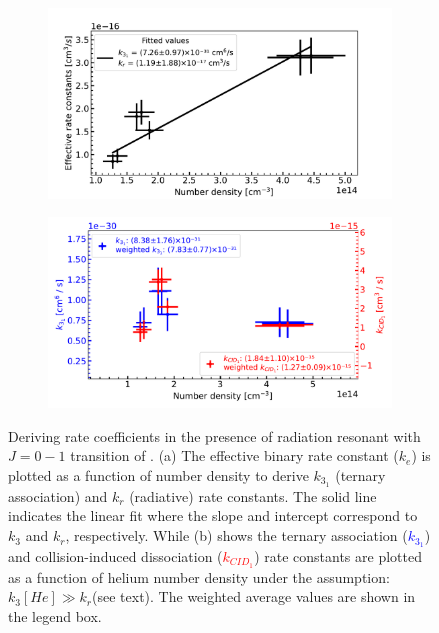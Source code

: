 \begin{figure}[!htb]
    \centering
    \begin{subfigure}[b]{0.49\textwidth}
        \centering
        \includegraphics[width=1\textwidth]{figures/measurements/kinetics/functionOf_nHe/on_4.8K_k31_effective_rate_constants.pdf}
        \caption{}
        \label{fig:on:effective-rate-constants}
    \end{subfigure}
    \hfill
    \begin{subfigure}[b]{0.49\textwidth}
        \centering
        \includegraphics[width=1\textwidth]{figures/measurements/kinetics/functionOf_nHe/on_4.8K_k3_kCID_1_as_functionOfnHe.pdf}
        \caption{}
        \label{fig:on:rate-constants}
    \end{subfigure}

    \caption{Deriving rate coefficients in the presence of radiation resonant with $J=0-1$ transition of \CD. (a) The effective binary rate constant ($k_e$) is plotted as a function of number density to derive $k_{3_1}$ (ternary association) and $k_r$ (radiative) rate constants. The solid line indicates the linear fit where the slope and intercept correspond to $k_3$ and $k_r$, respectively. While (b) shows the ternary association (\textcolor{blue}{$k_{3_1}$}) and collision-induced dissociation (\textcolor{red}{$k_{CID_1}$}) rate constants are plotted as a function of helium number density under the assumption: $k_3[He] \gg k_r$(see text). The weighted average values are shown in the legend box.}
    \label{fig:on:effective-and-ternary}

\end{figure}
